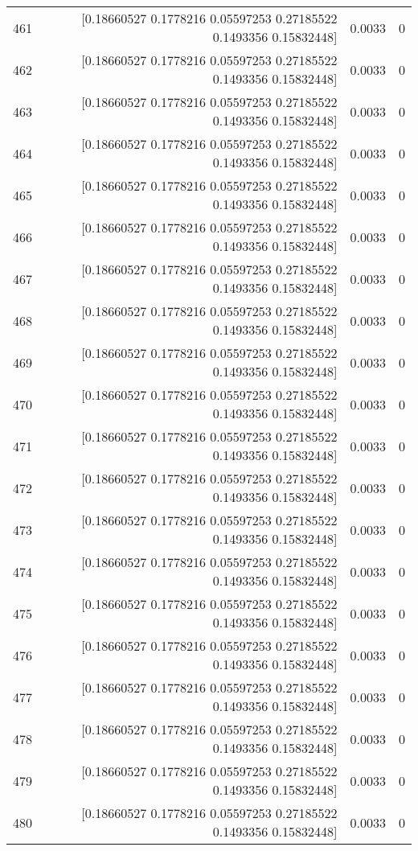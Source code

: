 \begin{longtable}{lrrr}
461 & [0.18660527 0.1778216  0.05597253 0.27185522 0.1493356  0.15832448] & 0.0033 & 0 \\
462 & [0.18660527 0.1778216  0.05597253 0.27185522 0.1493356  0.15832448] & 0.0033 & 0 \\
463 & [0.18660527 0.1778216  0.05597253 0.27185522 0.1493356  0.15832448] & 0.0033 & 0 \\
464 & [0.18660527 0.1778216  0.05597253 0.27185522 0.1493356  0.15832448] & 0.0033 & 0 \\
465 & [0.18660527 0.1778216  0.05597253 0.27185522 0.1493356  0.15832448] & 0.0033 & 0 \\
466 & [0.18660527 0.1778216  0.05597253 0.27185522 0.1493356  0.15832448] & 0.0033 & 0 \\
467 & [0.18660527 0.1778216  0.05597253 0.27185522 0.1493356  0.15832448] & 0.0033 & 0 \\
468 & [0.18660527 0.1778216  0.05597253 0.27185522 0.1493356  0.15832448] & 0.0033 & 0 \\
469 & [0.18660527 0.1778216  0.05597253 0.27185522 0.1493356  0.15832448] & 0.0033 & 0 \\
470 & [0.18660527 0.1778216  0.05597253 0.27185522 0.1493356  0.15832448] & 0.0033 & 0 \\
471 & [0.18660527 0.1778216  0.05597253 0.27185522 0.1493356  0.15832448] & 0.0033 & 0 \\
472 & [0.18660527 0.1778216  0.05597253 0.27185522 0.1493356  0.15832448] & 0.0033 & 0 \\
473 & [0.18660527 0.1778216  0.05597253 0.27185522 0.1493356  0.15832448] & 0.0033 & 0 \\
474 & [0.18660527 0.1778216  0.05597253 0.27185522 0.1493356  0.15832448] & 0.0033 & 0 \\
475 & [0.18660527 0.1778216  0.05597253 0.27185522 0.1493356  0.15832448] & 0.0033 & 0 \\
476 & [0.18660527 0.1778216  0.05597253 0.27185522 0.1493356  0.15832448] & 0.0033 & 0 \\
477 & [0.18660527 0.1778216  0.05597253 0.27185522 0.1493356  0.15832448] & 0.0033 & 0 \\
478 & [0.18660527 0.1778216  0.05597253 0.27185522 0.1493356  0.15832448] & 0.0033 & 0 \\
479 & [0.18660527 0.1778216  0.05597253 0.27185522 0.1493356  0.15832448] & 0.0033 & 0 \\
480 & [0.18660527 0.1778216  0.05597253 0.27185522 0.1493356  0.15832448] & 0.0033 & 0 \\

\end{longtable}
